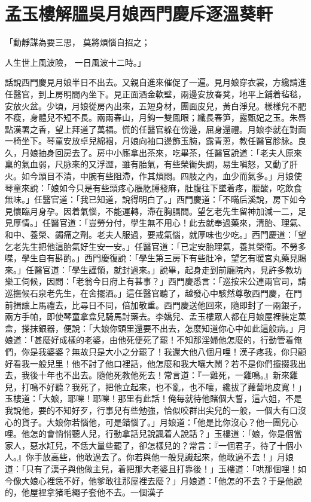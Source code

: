 %

\chapter{孟玉樓解膃吳月娘\KG 西門慶斥逐溫葵軒}


「動靜謀為要三思，  莫將煩惱自招之；

人生世上風波險，  一日風波十二時。」

話說西門慶見月娘半日不出去。又親自進來催促了一遍。見月娘穿衣裳，方纔請進任醫官，到上房明間內坐下。見正面酒金軟壁，兩邊安放春凳，地平上鋪着毡毯，安放火盆。少頃，月娘從房內出來，五短身材，團面皮兒，黃白淨兒。樣樣兒不肥不瘦，身體兒不短不長。兩兩春山，月鈎一雙鳳眼；纖長春笋，露甄妃之玉。朱唇點漢署之香，望上拜道了萬福。慌的任醫官躲在傍邊，屈身還禮。月娘李就在對面一椅坐下。琴童安放卓兒綿裀，月娘向袖口邊飾玉腕，露青蔥，教任醫官胗脉。良久，月娘抽身回房去了。房中小廝拿出茶來，吃畢茶，任醫官說道：「老夫人原來稟的氣血弱，尺脉來的又浮澀，雖有胎氣，有些榮衞失調，易生嗔怒，又動了肝火。如今頭目不清，中腕有些阻滯，作其煩悶。四肢之內，血少而氣多。」月娘使琴童來說：「娘如今只是有些頭疼心脹肐膊發麻，肚腹往下墜着疼，腰酸，吃飲食無味。」任醫官道：「我已知道，說得明白了。」西門慶道：「不瞞后溪說，房下如今見懷臨月身孕。因着氣惱，不能運轉，滯在胸膈間。望乞老先生留神加減一二，足見厚情。」任醫官道：「豈勞分付，學生無不用心！此去就奉過藥來，清胎、理氣、和中、養榮、蠲痛之劑。老夫人服過，要戒氣惱，就厚味也少吃。」西門慶道：「望乞老先生把他這胎氣好生安一安。」任醫官道：「已定安胎理氣，養其榮衞。不勞多喋，學生自有斟酌。」西門慶復說：「學生第三房下有些肚冷，望乞有暖宮丸藥見賜來。」任醫官道：「學生謹領，就封過來。」說畢，起身走到前廳院內，見許多教坊樂工伺候，因問：「老翁今日府上有甚事？」西門慶悉言：「巡按宋公連兩官司，請巡撫候石泉老先生，在舍擺酒。」這任醫官聽了，越發心中駭然尊敬西門慶，在門前揖讓上馬禮去，比尋日不同，倍加敬重。西門慶送他回來，隨即封了一兩銀子，兩方手帕，即使琴童拿盒兒騎馬討藥去。李嬌兒、孟玉樓眾人都在月娘屋裡裝定菓盒，搽抹銀器，便說：「大娘你頭里還要不出去，怎麼知道你心中如此這般病。」月娘道：「甚麼好成樣的老婆，由他死便死了罷！不知那淫婦他怎麼的，行動管着俺們，你是我婆婆？無故只是大小之分罷了！我還大他八個月哩！漢子疼我，你只顧好看我一般兒里！他不討了他口裡話，他怎麼和我大嚷大鬧？若不是你們攛掇我出去，我後十年也不出去。隨他死教他死去！常言道：『一雞死，一雞鳴。』新來雞兒，打鳴不好聽？我死了，把他立起來，也不亂，也不嚷，纔拔了蘿蔔地皮寬！」玉樓道：「大娘，耶嚛！耶嚛！那里有此話！俺每就待他賭個大誓，這六姐，不是我說他，要的不知好歹，行事兒有些勉強，恰似咬群出尖兒的一般，一個大有口沒心的貨子。大娘你若惱他，可是錯惱了。」月娘道：「他是比你沒心？他一團兒心哩。他怎的會悄悄聽人兒，行動拿話兒說諷着人說話？」玉樓道：「娘，你是個當家人，惡水缸兒，不恁大量些罷了，卻怎樣兒的？常言：『一個君子，待了十個小人。』你手放高些，他敢過去了。你若與他一般見識起來，他敢過不去！」月娘道：「只有了漢子與他做主兒，着把那大老婆且打靠後！」玉樓道：「哄那個哩！如今像大娘心裡恁不好，他爹敢往那屋裡去麼？」月娘道：「他怎的不去？于是他說的，他屋裡拿猪毛繩子套他不去。一個漢子